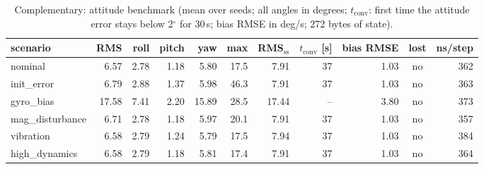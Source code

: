\begin{table}[H]\centering\footnotesize\setlength{\tabcolsep}{3.5pt}\caption{Complementary: attitude benchmark (mean over seeds; all angles in degrees; $t_\mathrm{conv}$: first time the attitude error stays below 2$^\circ$ for 30\,s; bias RMSE in deg/s; 272 bytes of state).}\label{tab:imu_Complementary}
\begin{tabular}{lrrrrrrrrcr}\toprule scenario & RMS & roll & pitch & yaw & max & RMS$_\mathrm{ss}$ & $t_\mathrm{conv}$ [s] & bias RMSE & lost & ns/step \\ \midrule
nominal & 6.57 & 2.78 & 1.18 & 5.80 & 17.5 & 7.91 & 37 & 1.03 & no & 362 \\
init\_error & 6.79 & 2.88 & 1.37 & 5.98 & 46.3 & 7.91 & 37 & 1.03 & no & 363 \\
gyro\_bias & 17.58 & 7.41 & 2.20 & 15.89 & 28.5 & 17.44 & -- & 3.80 & no & 373 \\
mag\_disturbance & 6.71 & 2.78 & 1.18 & 5.97 & 20.1 & 7.91 & 37 & 1.03 & no & 357 \\
vibration & 6.58 & 2.79 & 1.24 & 5.79 & 17.5 & 7.94 & 37 & 1.03 & no & 384 \\
high\_dynamics & 6.58 & 2.79 & 1.18 & 5.81 & 17.4 & 7.91 & 37 & 1.03 & no & 364 \\
\bottomrule\end{tabular}\end{table}

